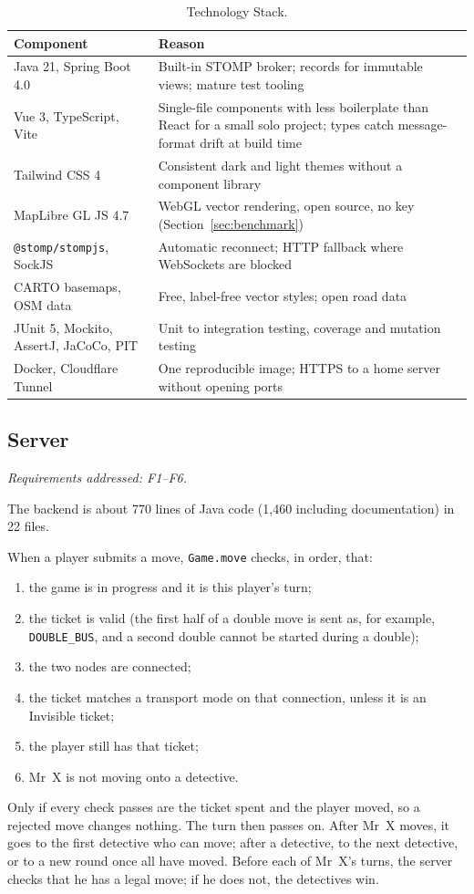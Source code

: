 \documentclass[lettersize,journal]{IEEEtran}
\newcommand{\reqs}[1]{\noindent\textit{Requirements addressed: #1.}\par\smallskip}
\begin{document}
\begin{table}[!t]
\caption{Technology Stack.}
\label{tab:stack}
\centering
\small
\begin{tabular}{@{}p{}p{}@{}}
\toprule
Component & Reason \\
\midrule
Java 21, Spring Boot 4.0 & Built-in STOMP broker; records for immutable views; mature test tooling \\
Vue 3, TypeScript, Vite & Single-file components with less boilerplate than React for a small solo project; types catch message-format drift at build time \\
Tailwind CSS 4 & Consistent dark and light themes without a component library \\
MapLibre GL JS 4.7 & WebGL vector rendering, open source, no key (Section~\ref{sec:benchmark}) \\
\texttt{@stomp/stompjs}, SockJS & Automatic reconnect; HTTP fallback where WebSockets are blocked \\
CARTO basemaps, OSM data & Free, label-free vector styles; open road data \\
JUnit 5, Mockito, AssertJ, JaCoCo, PIT & Unit to integration testing, coverage and mutation testing \\
Docker, Cloudflare Tunnel & One reproducible image; HTTPS to a home server without opening ports \\
\bottomrule
\end{tabular}
\end{table}

\subsection{Server}\label{sec:server}
\reqs{F1--F6}
The backend is about 770 lines of Java code (1,460 including documentation) in 22 files.

When a player submits a move, \texttt{Game.move} checks, in order, that:
\begin{enumerate}
	\item the game is in progress and it is this player's turn;
	\item the ticket is valid (the first half of a double move is sent as, for example, \texttt{DOUBLE\_BUS}, and a second double cannot be started during a double);
	\item the two nodes are connected;
	\item the ticket matches a transport mode on that connection, unless it is an Invisible ticket;
	\item the player still has that ticket;
	\item Mr~X is not moving onto a detective.
\end{enumerate}
Only if every check passes are the ticket spent and the player moved, so a rejected move changes nothing. The turn then passes on. After Mr~X moves, it goes to the first detective who can move; after a detective, to the next detective, or to a new round once all have moved. Before each of Mr~X's turns, the server checks that he has a legal move; if he does not, the detectives win.
\end{document}
